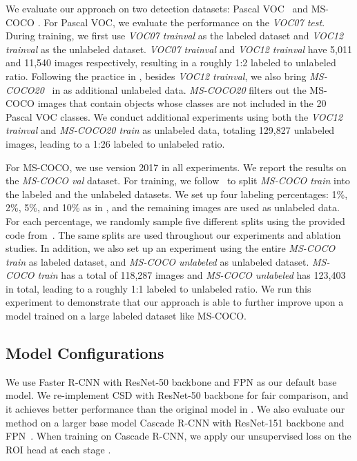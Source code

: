\documentclass[final]{cvpr}
\begin{document}
We evaluate our approach on two detection datasets: Pascal VOC~\cite{everingham2010pascal} and MS-COCO \cite{lin2014microsoft}.
For Pascal VOC, we evaluate the performance on the \textit{VOC07 test}.
During training, we first use \textit{VOC07 trainval} as the labeled dataset and \textit{VOC12 trainval} as the unlabeled dataset.
\textit{VOC07 trainval} and \textit{VOC12 trainval} have 5,011 and 11,540 images respectively, resulting in a roughly 1:2 labeled to unlabeled ratio.
Following the practice in \cite{jeong2019consistency, sohn2020simple}, besides \textit{VOC12 trainval}, we also bring \textit{MS-COCO20}~\cite{jeong2019consistency, sohn2020simple} in as additional unlabeled data.
\textit{MS-COCO20} filters out the MS-COCO images that contain objects whose classes are not included in the 20 Pascal VOC classes.
We conduct additional experiments using both the \textit{VOC12 trainval} and \textit{MS-COCO20 train} as unlabeled data, totaling 129,827 unlabeled images, leading to a 1:26 labeled to unlabeled ratio.

For MS-COCO, we use version 2017 in all experiments. We report the results on the \textit{MS-COCO val} dataset.
For training, we follow~\cite{sohn2020simple} to split \textit{MS-COCO train} into the labeled and the unlabeled datasets.
We set up four labeling percentages: 1\%, 2\%, 5\%, and 10\% as in \cite{sohn2020simple}, and the remaining images are used as unlabeled data.
For each percentage, we randomly sample five different splits using the provided code from~\cite{sohn2020simple}. 
The same splits are used throughout our experiments and ablation studies.
In addition, we also set up an experiment using the entire \textit{MS-COCO train} as labeled dataset, and \textit{MS-COCO unlabeled} as unlabeled dataset.
\textit{MS-COCO train} has a total of 118,287 images and \textit{MS-COCO unlabeled} has 123,403 in total, leading to a roughly 1:1 labeled to unlabeled ratio.
We run this experiment to demonstrate that our approach is able to further improve upon a model trained on a large labeled dataset like MS-COCO.

\subsection{Model Configurations}

We use Faster R-CNN with ResNet-50 backbone and FPN as our default base model.
We re-implement CSD with ResNet-50 backbone for fair comparison, and it achieves better performance than the original model in \cite{jeong2019consistency}.
We also evaluate our method on a larger base model Cascade R-CNN with ResNet-151 backbone and FPN~\cite{cai2018cascade,lin2017feature}.
When training on Cascade R-CNN, we apply our unsupervised loss on the ROI head at each stage .
\end{document}
